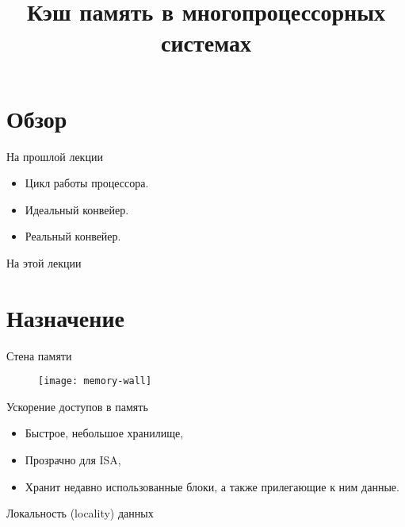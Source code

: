 

\title{Кэш память в многопроцессорных системах}



\begin{frame}
\titlepage
\end{frame}

\section*{Обзор}

\begin{frame}{На прошлой лекции}
\begin{itemize}
    \item Цикл работы процессора.
    \item Идеальный конвейер.
    \item Реальный конвейер.
\end{itemize}
\end{frame}

\begin{frame}{На этой лекции}
\tableofcontents
\end{frame}

\section{Назначение}

\begin{frame}{Стена памяти}
\begin{figure}
    \centering
    \texttt{[image: memory-wall]}
\end{figure}
\end{frame}

\begin{frame}{Ускорение доступов в память}
\begin{itemize}
    \item Быстрое, небольшое хранилище,
    \item Прозрачно для ISA,
    \item Хранит недавно использованные блоки, а также прилегающие к ним данные.
\end{itemize}
\end{frame}

\begin{frame}{Локальность (\abbr locality) данных}
\centering
{}
\end{frame}

